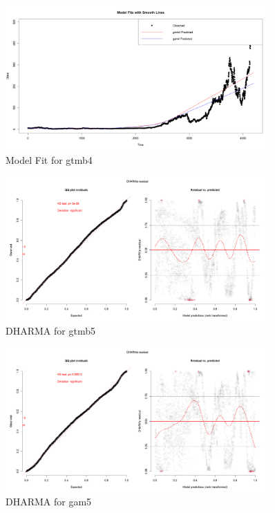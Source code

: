 \begin{figure}[h]
    \centering
    \includegraphics[width=0.9\textwidth]{visuals/mod_fit_gtmb4.png}
    \caption{Model Fit for gtmb4}
    \label{fig:modfitgtmb4}
\end{figure}

\begin{figure}[h]
    \centering
    \includegraphics[width=0.9\textwidth]{visuals/DHARMa_gtmb5.png}
    \caption{DHARMA for gtmb5}
    \label{fig:dharmagtmb5}
\end{figure}

\begin{figure}[h]
    \centering
    \includegraphics[width=0.9\textwidth]{visuals/DHARMa_gam5.png}
    \caption{DHARMA for gam5}
    \label{fig:dharmagam5}
\end{figure}

